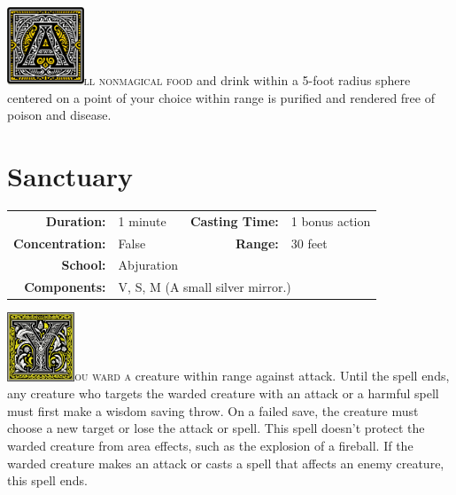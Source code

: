 \documentclass[12pt,showtrims]{memoir}
\begin{document}
\vspace{1\baselineskip}\noindent 
\lettrine[lines=4]{\includegraphics[height=66pt]{initials/A.png}}{ll nonmagical food} and drink within a 5-foot radius sphere centered on a point of your choice within range is purified and rendered free of poison and disease.

\newpage
\section*{Sanctuary}

{
\small\centering\vspace{-6pt}
\begin{tabular}{rlrl}
\toprule

\textbf{Duration:} & 1 minute &
\textbf{Casting Time:} & 1 bonus action \\
\textbf{Concentration:} & False &
\textbf{Range:} & 30 feet \\
\textbf{School:} & Abjuration \\
\textbf{Components:} & \multicolumn{3}{p{0.7\textwidth}}{V, S, M (A small silver mirror.)}\\

\bottomrule
\end{tabular}
}

\vspace{1\baselineskip}\noindent
\lettrine[lines=4]{\includegraphics[height=58pt]{initials/Y.png}}{ou ward a} creature within range against attack. Until the spell ends, any creature who targets the warded creature with an attack or a harmful spell must first make a wisdom saving throw. On a failed save, the creature must choose a new target or lose the attack or spell. This spell doesn't protect the warded creature from area effects, such as the explosion of a fireball. If the warded creature makes an attack or casts a spell that affects an enemy creature, this spell ends.

\newpage
{}
\newpage
\end{document}
